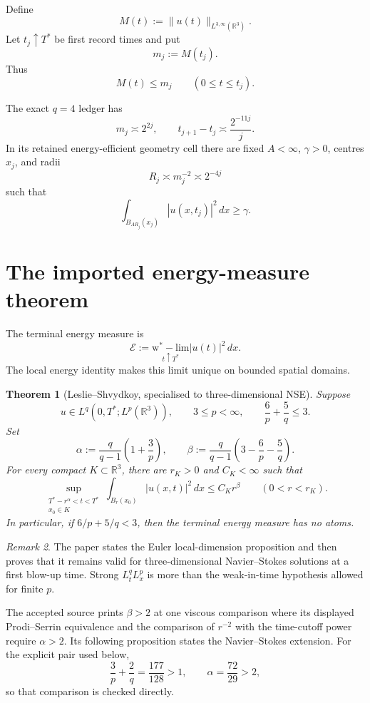 \documentclass[11pt]{article}
\newtheorem{theorem}{Theorem}
\theoremstyle{remark}
\newtheorem{remark}[theorem]{Remark}
\newcommand{\R}{\mathbb R}
\begin{document}
Define
\[
 M(t):=\|u(t)\|_{L^{3,\infty}(\R^3)}.
\]
Let \(t_j\uparrow T^*\) be first record times and put
\[
 m_j:=M(t_j).
\]
Thus
\begin{equation}
 \label{eq:first-record}
 M(t)\le m_j\qquad(0\le t\le t_j).
\end{equation}

The exact \(q=4\) ledger has
\begin{equation}
 \label{eq:q4}
 m_j\asymp2^{2j},
 \qquad
 t_{j+1}-t_j\asymp\frac{2^{-11j}}j.
\end{equation}
In its retained energy-efficient geometry cell there are fixed
\(A<\infty\), \(\gamma>0\), centres \(x_j\), and radii
\begin{equation}
 \label{eq:radii}
 R_j\asymp m_j^{-2}\asymp2^{-4j}
\end{equation}
such that
\begin{equation}
 \label{eq:floor}
 \int_{B_{AR_j}(x_j)}|u(x,t_j)|^2\,dx\ge\gamma.
\end{equation}

\section{The imported energy-measure theorem}

The terminal energy measure is
\[
 \mathcal E
 :=
 \underset{t\uparrow T^*}{\operatorname{w^*\!-\!lim}}
 |u(t)|^2\,dx.
\]
The local energy identity makes this limit unique on bounded spatial
domains.

\begin{theorem}[Leslie--Shvydkoy, specialised to three-dimensional NSE]
\label{thm:LS}
Suppose
\[
 u\in L^q(0,T^*;L^p(\R^3)),
 \qquad
 3\le p<\infty,
 \qquad
 \frac6p+\frac5q\le3.
\]
Set
\[
 \alpha
 :=
 \frac{q}{q-1}\left(1+\frac3p\right),
 \qquad
 \beta
 :=
 \frac{q}{q-1}
 \left(3-\frac6p-\frac5q\right).
\]
For every compact \(K\subset\R^3\), there are \(r_K>0\) and \(C_K<\infty\)
such that
\begin{equation}
 \label{eq:LS-local}
 \sup_{\substack{T^*-r^\alpha<t<T^*\\x_0\in K}}
 \int_{B_r(x_0)}|u(x,t)|^2\,dx
 \le C_Kr^\beta
 \qquad(0<r<r_K).
\end{equation}
In particular, if \(6/p+5/q<3\), then the terminal energy measure has no
atoms.
\end{theorem}

\begin{remark}
The paper states the Euler local-dimension proposition and then proves
that it remains valid for three-dimensional Navier--Stokes solutions at a
first blow-up time.  Strong \(L^q_tL^p_x\) is more than the weak-in-time
hypothesis allowed for finite \(p\).

The accepted source prints \(\beta>2\) at one viscous comparison where its
displayed Prodi--Serrin equivalence and the comparison of \(r^{-2}\) with
the time-cutoff power require \(\alpha>2\).  Its following proposition
states the Navier--Stokes extension.  For the explicit pair used below,
\[
 \frac3p+\frac2q=\frac{177}{128}>1,
 \qquad
 \alpha=\frac{72}{29}>2,
\]
so that comparison is checked directly.
\end{remark}
\end{document}

